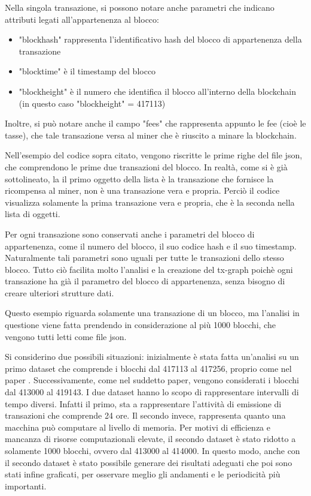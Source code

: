 Nella singola transazione, si possono notare anche parametri che indicano attributi legati all'appartenenza al blocco:
\begin{itemize}
	\item "blockhash" rappresenta l'identificativo hash del blocco di appartenenza della transazione
	\item "blocktime" è il timestamp del blocco
	\item "blockheight" è il numero che identifica il blocco all'interno della blockchain (in questo caso "blockheight" = 417113)
\end{itemize}
Inoltre, si può notare anche il campo "fees" che rappresenta appunto le fee (cioè le tasse), che tale transazione versa al miner che è riuscito a minare la blockchain.

Nell'esempio del codice sopra citato, vengono riscritte le prime righe del file json, che comprendono le prime due transazioni del blocco. In realtà, come si è già sottolineato, la il primo oggetto della lista è la transazione che fornisce la ricompensa al miner, non è una transazione vera e propria. Perciò il codice visualizza solamente la prima transazione vera e propria, che è la seconda nella lista di oggetti.

Per ogni transazione sono conservati anche i parametri del blocco di appartenenza, come il numero del blocco, il suo codice hash e il suo timestamp. Naturalmente tali parametri sono uguali per tutte le transazioni dello stesso blocco. Tutto ciò facilita molto l'analisi e la creazione del tx-graph poichè ogni transazione ha già il parametro del blocco di appartenenza, senza bisogno di creare ulteriori strutture dati.

Questo esempio riguarda solamente una transazione di un blocco, ma l'analisi in questione viene fatta prendendo in considerazione al più 1000 blocchi, che vengono tutti letti come file json.

Si considerino due possibili situazioni: inizialmente è stata fatta un'analisi su un primo dataset che comprende i blocchi dal 417113 al 417256, proprio come nel paper \cite{ddp-ltcbh-17}. Successivamente, come nel suddetto paper, vengono considerati i blocchi dal 413000 al 419143. I due dataset hanno lo scopo di rappresentare intervalli di tempo diversi. Infatti il primo, sta a rappresentare l'attività di emissione di transazioni che comprende 24 ore. Il secondo invece, rappresenta quanto una macchina può computare al livello di memoria. Per motivi di efficienza e mancanza di risorse computazionali elevate, il secondo dataset è stato ridotto a solamente 1000 blocchi, ovvero dal 413000 al 414000. In questo modo, anche con il secondo dataset è stato possibile generare dei risultati adeguati che poi sono stati infine graficati, per osservare meglio gli andamenti e le periodicità più importanti.

